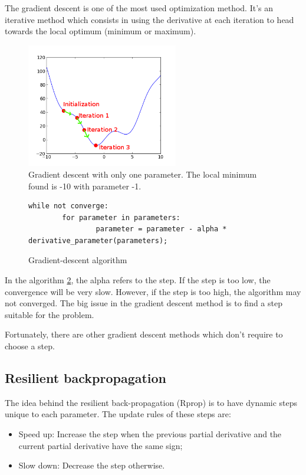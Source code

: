 \documentclass{techrep}
\begin{document}
The gradient descent is one of the most used optimization method. It's
an iterative method which consists in using the derivative at each
iteration to head towards the local optimum (minimum or maximum).

\begin{figure}[H]
  \centering
  \includegraphics[width=250px]{gradient_descent}
  \caption{Gradient descent with only one parameter. The local minimum found is -10 with parameter -1.}
  \label{gradient_descent}
\end{figure}

\begin{figure}[H]
  \begin{lstlisting}[frame=single]
    while not converge:
        for parameter in parameters:
                parameter = parameter - alpha * derivative_parameter(parameters);
  \end{lstlisting}
  \caption{Gradient-descent algorithm}
  \label{algo_gradient_descent}
\end{figure}

In the algorithm \ref{algo_gradient_descent}, the alpha refers to the
step. If the step is too low, the convergence will be very
slow. However, if the step is too high, the algorithm may not
converged. The big issue in the gradient descent method is to find a
step suitable for the problem.

Fortunately, there are other gradient descent methods which don't
require to choose a step.

\subsection{Resilient backpropagation}

The idea behind the resilient back-propagation (Rprop) is to have
dynamic steps unique to each parameter.
The update rules of these steps are:
\begin{itemize}
\item Speed up: Increase the step when the previous partial derivative and the
  current partial derivative have the same sign;
\item Slow down: Decrease the step otherwise.
\end{itemize}
\end{document}

